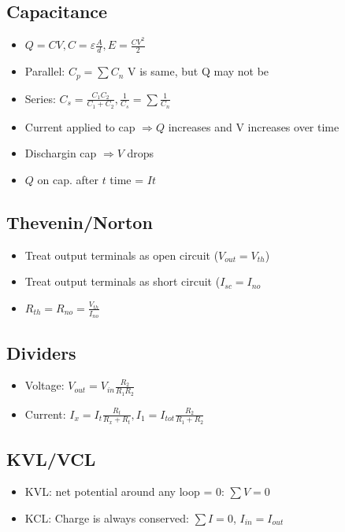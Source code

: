 \documentclass{article}\usepackage{amsmath,amssymb,amsthm,tikz,tkz-graph,color,chngpage,soul,hyperref,csquotes,graphicx,floatrow}\newcommand*{\QEDB}{\hfill\ensuremath{\square}}\newtheorem*{prop}{Proposition}\renewcommand{\theenumi}{\alph{enumi}}\usepackage[shortlabels]{enumitem}\usepackage[nobreak=true]{mdframed}\usetikzlibrary{matrix,calc}\MakeOuterQuote{"}\usepackage[margin=0.75in]{geometry} \newtheorem{theorem}{Theorem}
\begin{document}
\subsection*{Capacitance}
\begin{itemize}
    \item $Q=CV, C=\varepsilon\frac{A}{d}, E=\frac{CV^2}{2}$
    \item Parallel: $C_p = \sum C_n$ V is same, but Q may not be
    \item Series: $C_s = \frac{C_1C_2}{C_1+C_2}, \frac{1}{C_s}=\sum\frac{1}{C_n}$
    \item Current applied to cap $\Rightarrow Q$ increases and V increases over time
    \item Dischargin cap $\Rightarrow V$ drops
    \item $Q$ on cap. after $t$ time = $It$
\end{itemize}
\subsection*{Thevenin/Norton}
\begin{itemize}
    \item Treat output terminals as open circuit ($V_{out}=V_{th}$)
    \item Treat output terminals as short circuit ($I_{sc}=I_{no}$
    \item $R_{th} = R_{no} = \frac{V_{th}}{I_{no}}$
\end{itemize}
\subsection*{Dividers}
\begin{itemize}
    \item Voltage: $V_{out} = V_{in}\frac{R_2}{R_1R_2}$
    \item Current: $I_{x} = I_t \frac{R_t}{R_x+R_t}, I_1=I_{tot}\frac{R_2}{R_1+R_2}$
\end{itemize}
\subsection*{KVL/VCL}
\begin{itemize}
    \item KVL: net potential around any loop = 0: $\sum V = 0$
    \item KCL: Charge is always conserved: $\sum I = 0$, $I_{in} = I_{out}$
\end{itemize}
\end{document}
